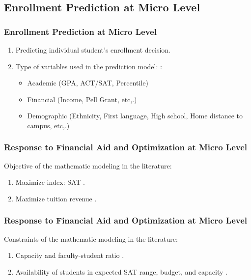 \documentclass[aspectratio=169]{beamer}
\begin{document}
\subsection{Enrollment Prediction at Micro Level}
\begin{frame}
    \frametitle{Enrollment Prediction at Micro Level}
    \begin{enumerate}
    \item Predicting individual student's enrollment decision.
    
    \item Type of variables used in the prediction model:
\citet{Paulsen1990,Hossler1998}:
    \begin{itemize}
    \item Academic (GPA, ACT/SAT, Percentile)
    \item Financial (Income, Pell Grant, etc,.)
    \item Demographic (Ethnicity, First language, 
    High school, Home distance to campus, etc,.)
    \end{itemize}
    \end{enumerate}
    
\end{frame}

\begin{frame}
    \frametitle{Response to Financial Aid and Optimization at Micro 
    Level}
    Objective of the mathematic modeling in the literature:
    \begin{enumerate}
    \item Maximize index: SAT
      \citep{Ehrenberg1984,Sugrue2010}.
    \item Maximize tuition revenue \citep{Thanh2007}.
    \end{enumerate}
    
   
\end{frame}

\begin{frame}
    \frametitle{Response to Financial Aid and Optimization at Micro Level}
    Constraints of the mathematic modeling in the literature:
    \begin{enumerate}
    \item Capacity and faculty-student ratio
    \citep{Thanh2007}.
    
    \item Availability of students in expected SAT range, 
    budget, and capacity
    \citep{Sugrue2010}.
    
    \end{enumerate}
\end{frame}
\end{document}
